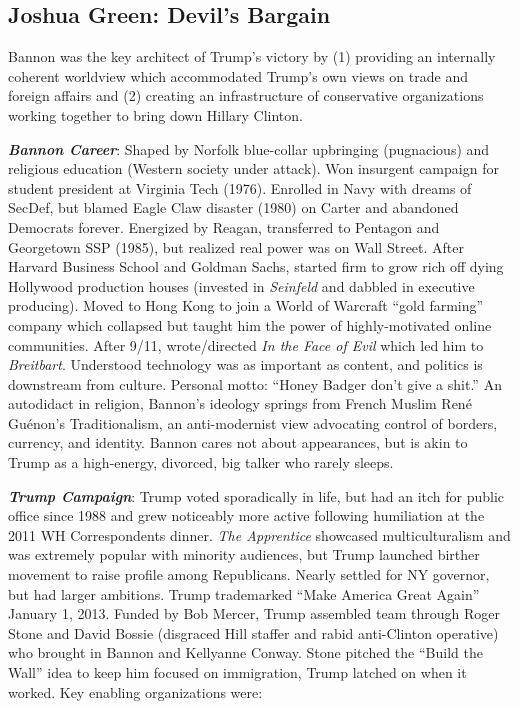 \documentclass[
]{article}
\begin{document}
\hypertarget{joshua-green-devils-bargain}{%
\subsection{Joshua Green: Devil's
Bargain}\label{joshua-green-devils-bargain}}

Bannon was the key architect of Trump's victory by (1) providing an
internally coherent worldview which accommodated Trump's own views on
trade and foreign affairs and (2) creating an infrastructure of
conservative organizations working together to bring down Hillary
Clinton.

\textbf{\emph{Bannon Career}}: Shaped by Norfolk blue-collar upbringing
(pugnacious) and religious education (Western society under attack). Won
insurgent campaign for student president at Virginia Tech (1976).
Enrolled in Navy with dreams of SecDef, but blamed Eagle Claw disaster
(1980) on Carter and abandoned Democrats forever. Energized by Reagan,
transferred to Pentagon and Georgetown SSP (1985), but realized real
power was on Wall Street. After Harvard Business School and Goldman
Sachs, started firm to grow rich off dying Hollywood production houses
(invested in \emph{Seinfeld} and dabbled in executive producing). Moved
to Hong Kong to join a World of Warcraft ``gold farming'' company which
collapsed but taught him the power of highly-motivated online
communities. After 9/11, wrote/directed \emph{In the Face of Evil} which
led him to \emph{Breitbart}. Understood technology was as important as
content, and politics is downstream from culture. Personal motto:
``Honey Badger don't give a shit.'' An autodidact in religion, Bannon's
ideology springs from French Muslim René Guénon's Traditionalism, an
anti-modernist view advocating control of borders, currency, and
identity. Bannon cares not about appearances, but is akin to Trump as a
high-energy, divorced, big talker who rarely sleeps.

\textbf{\emph{Trump Campaign}}: Trump voted sporadically in life, but
had an itch for public office since 1988 and grew noticeably more active
following humiliation at the 2011 WH Correspondents dinner. \emph{The
Apprentice} showcased multiculturalism and was extremely popular with
minority audiences, but Trump launched birther movement to raise profile
among Republicans. Nearly settled for NY governor, but had larger
ambitions. Trump trademarked ``Make America Great Again'' January 1,
2013. Funded by Bob Mercer, Trump assembled team through Roger Stone and
David Bossie (disgraced Hill staffer and rabid anti-Clinton operative)
who brought in Bannon and Kellyanne Conway. Stone pitched the ``Build
the Wall'' idea to keep him focused on immigration, Trump latched on
when it worked. Key enabling organizations were:
\end{document}

